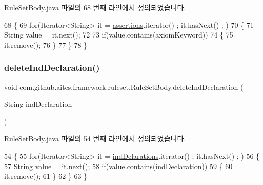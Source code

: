 Rule\+Set\+Body.\+java 파일의 68 번째 라인에서 정의되었습니다.


\begin{DoxyCode}
68                                                     \{   
69         \textcolor{keywordflow}{for}(Iterator<String> it = \mbox{\hyperlink{classcom_1_1github_1_1aites_1_1framework_1_1ruleset_1_1_rule_set_body_adc0be27d8b17ccd369c32843397404e6}{assertions}}.iterator() ; it.hasNext() ; )
70         \{
71             String value = it.next();
72             
73             \textcolor{keywordflow}{if}(value.contains(axiomKeyword))
74             \{
75                 it.remove();
76             \}
77         \}
78     \}
\end{DoxyCode}
\mbox{\label{classcom_1_1github_1_1aites_1_1framework_1_1ruleset_1_1_rule_set_body_a660eccdac94de7432cdb2fee1326c826}} 
\subsubsection{\texorpdfstring{delete\+Ind\+Declaration()}{deleteIndDeclaration()}}
{\footnotesize\ttfamily void com.\+github.\+aites.\+framework.\+ruleset.\+Rule\+Set\+Body.\+delete\+Ind\+Declaration (\begin{DoxyParamCaption}\item[{String}]{ind\+Declaration }\end{DoxyParamCaption})}



Rule\+Set\+Body.\+java 파일의 54 번째 라인에서 정의되었습니다.


\begin{DoxyCode}
54                                                            \{    
55         \textcolor{keywordflow}{for}(Iterator<String> it = \mbox{\hyperlink{classcom_1_1github_1_1aites_1_1framework_1_1ruleset_1_1_rule_set_body_ac25f4ee84e59e4ebfc47452c84ead7c6}{indDclarations}}.iterator() ; it.hasNext() ; )
56         \{
57             String value = it.next();
58             \textcolor{keywordflow}{if}(value.contains(indDeclaration))
59             \{
60                 it.remove();
61             \}
62         \}
63     \}
\end{DoxyCode}
\mbox{\label{classcom_1_1github_1_1aites_1_1framework_1_1ruleset_1_1_rule_set_body_a1dc9e518f7c37c11345a96eeff9136fc}} 
